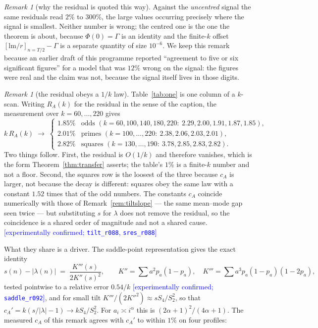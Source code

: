 \documentclass[11pt,a4paper]{article}
\theoremstyle{plain}
\theoremstyle{definition}
\theoremstyle{remark}
\newtheorem{remark}[theorem]{Remark}
\newcommand{\lm}{\mathrm{lm}}
\newcommand{\STATUS}[1]{\textcolor{blue}{\textsf{[#1]}}}
\begin{document}
\begin{remark}[why the residual is quoted this way]\label{rem:signalfraction}
Against the \emph{uncentred} signal the same residuals read $2\%$ to $300\%$, the large values
occurring precisely where the signal is smallest. Neither number is wrong; the centred one is
the one the theorem is about, because $\Phi(0)=\Gamma$ is an identity and the finite-$k$ offset
$[\lm/r]_{n=T/2}-\Gamma$ is a separate quantity of size $10^{-6}$.
We keep this remark because an earlier draft of this programme reported ``agreement to five or
six significant figures'' for a model that was $12\%$ wrong on the signal: the figures were
real and the claim was not, because the signal itself lives in those digits.
\end{remark}

\begin{remark}[the residual obeys a $1/k$ law]\label{rem:onek}
Table~\ref{tab:one} is one column of a $k$-scan. Writing $R_A(k)$ for the residual in the
sense of the caption, the measurement over $k=60,\dots,220$ gives
\[
   k\,R_A(k)\;\longrightarrow\;
   \begin{cases}
     1.85\% & \text{odds } (k=60,100,140,180,220:\ 2.29,2.00,1.91,1.87,1.85),\\
     2.01\% & \text{primes } (k=100,\dots,220:\ 2.38,2.06,2.03,2.01),\\
     2.82\% & \text{squares } (k=130,\dots,190:\ 3.78,2.85,2.83,2.82).
   \end{cases}
\]
Two things follow. First, the residual is $O(1/k)$ and therefore vanishes, which is the form
Theorem~\ref{thm:transfer} asserts; the table's $1\%$ is a finite-$k$ number and not a floor.
Second, the squares row is the loosest of the three because $c_A$ is larger, not because the
decay is different: squares obey the same law with a constant $1.52$ times that of the odd
numbers. The constants $c_A$ coincide numerically with those of
Remark~\ref{rem:tiltslope} --- the same mean--mode gap seen twice --- but substituting $s$ for
$\lambda$ does not remove the residual, so the coincidence is a shared order of magnitude and
not a shared cause. \STATUS{experimentally confirmed; \texttt{tilt\_r088}, \texttt{sres\_r088}}

What they share is a driver. The saddle-point representation gives the exact identity
\[
  s(n)-|\lambda(n)|\;=\;\frac{K'''(s)}{2K''(s)^{2}},
  \qquad K''=\sum a^{2}p_a(1-p_a),\quad K'''=\sum a^{3}p_a(1-p_a)(1-2p_a),
\]
tested pointwise to a relative error $0.54/k$ \STATUS{experimentally confirmed;
\texttt{saddle\_r092}}, and for small tilt $K'''/(2K''^{2})\approx sS_4/S_2^{2}$, so that
$c_A'=k(s/|\lambda|-1)\to kS_4/S_2^{2}$. For $a_i\asymp i^{\alpha}$ this is
$(2\alpha+1)^{2}/(4\alpha+1)$. The measured $c_A$ of this remark agrees with $c_A'$ to within
$1\%$ on four profiles:


\end{remark}
\end{document}
